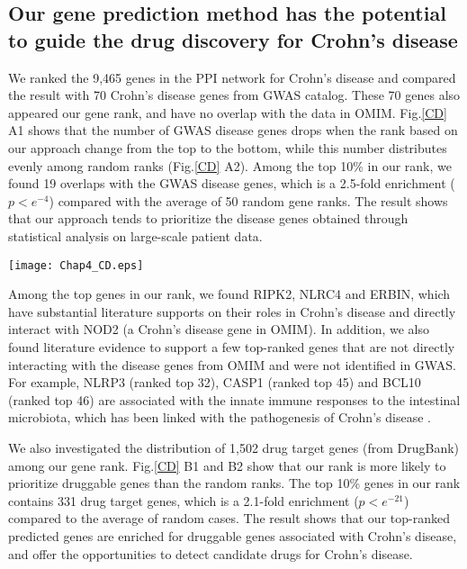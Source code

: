 \subsection{Our gene prediction method has the potential to guide the drug discovery for Crohn's disease}
We ranked the 9,465 genes in the PPI network for Crohn's disease
and compared the result with 70 Crohn's disease genes from GWAS catalog.
These 70 genes also appeared our gene rank,
and have no overlap with the data in OMIM.
Fig.\ref{CD} A1 shows that the number of GWAS disease genes drops
when the rank based on our approach change from the top to the bottom,
while this number distributes evenly among random ranks (Fig.\ref{CD} A2).
Among the top 10\% in our rank, we found 19 overlaps with the GWAS disease genes,
which is a 2.5-fold enrichment ($p<e^{-4}$) compared with the average of 50 random gene ranks.
The result shows that our approach tends to prioritize the disease genes obtained through
statistical analysis on large-scale patient data.
\begin{figure*}[!t]
\centering
\texttt{[image: Chap4\_CD.eps]}
\caption{A1-A2: Compare our gene rank with the Crohn's disease genes from GWAS.
B1-B2: Compare our gene rank with the drug target genes.
C1-C2: Compare our drug rank with the FDA-approved drugs.}
\vspace{-.5cm}
\label{CD}
\end{figure*}

Among the top genes in our rank, we found RIPK2, NLRC4
and ERBIN, which have substantial literature supports on their roles in Crohn's disease
\cite{jostins2012host,philpott2014nod,lupfer2013receptor,tomalka2011novel,standaert2009candida,gerard2013immunological,kufer2006role}
and directly interact with NOD2 (a Crohn's disease gene in OMIM).
In addition,
we also found literature evidence to support a few top-ranked genes that
are not directly interacting with the disease genes from OMIM
and were not identified in GWAS. For example,
NLRP3 (ranked top 32), CASP1 (ranked top 45) and BCL10 (ranked top 46)
are associated with the innate immune responses to the intestinal microbiota,
which has been linked with the pathogenesis of Crohn's disease
\cite{villani2009common,hirota2011nlrp3,netea20101beta,borthakur2007carrageenan}.

We also investigated the distribution of 1,502 drug target genes (from DrugBank)
among our gene rank.
Fig.\ref{CD} B1 and B2 show that our rank is more likely to prioritize
druggable genes than the random ranks.
The top 10\% genes in our rank contains 331 drug target genes,
which is a 2.1-fold enrichment ($p<e^{-21}$) compared
to the average of random cases.
The result shows that our top-ranked predicted genes are enriched for druggable
genes associated with Crohn's disease, and offer
the opportunities to detect candidate drugs for Crohn’s disease.

